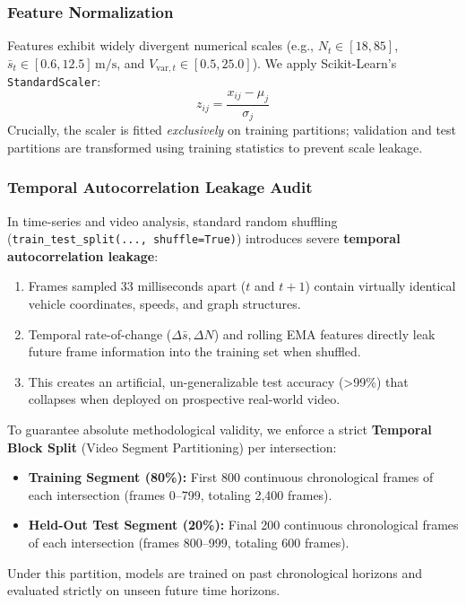 \documentclass[conference]{IEEEtran}
\begin{document}
\subsubsection{Feature Normalization}
Features exhibit widely divergent numerical scales (e.g., $N_t \in [18, 85]$, $\bar{s}_t \in [0.6, 12.5]\,\text{m/s}$, and $V_{\text{var}, t} \in [0.5, 25.0]$). We apply Scikit-Learn's \texttt{StandardScaler}:
\begin{equation}
    z_{ij} = \frac{x_{ij} - \mu_j}{\sigma_j}
\end{equation}
Crucially, the scaler is fitted \textit{exclusively} on training partitions; validation and test partitions are transformed using training statistics to prevent scale leakage.

\subsubsection{Temporal Autocorrelation Leakage Audit}
In time-series and video analysis, standard random shuffling (\texttt{train\_test\_split(..., shuffle=True)}) introduces severe \textbf{temporal autocorrelation leakage}:
\begin{enumerate}
    \item Frames sampled 33 milliseconds apart ($t$ and $t+1$) contain virtually identical vehicle coordinates, speeds, and graph structures.
    \item Temporal rate-of-change ($\Delta \bar{s}, \Delta N$) and rolling EMA features directly leak future frame information into the training set when shuffled.
    \item This creates an artificial, un-generalizable test accuracy (>99\%) that collapses when deployed on prospective real-world video.
\end{enumerate}

To guarantee absolute methodological validity, we enforce a strict \textbf{Temporal Block Split} (Video Segment Partitioning) per intersection:
\begin{itemize}
    \item \textbf{Training Segment (80\%):} First 800 continuous chronological frames of each intersection (frames 0--799, totaling 2,400 frames).
    \item \textbf{Held-Out Test Segment (20\%):} Final 200 continuous chronological frames of each intersection (frames 800--999, totaling 600 frames).
\end{itemize}
Under this partition, models are trained on past chronological horizons and evaluated strictly on unseen future time horizons.
\end{document}
